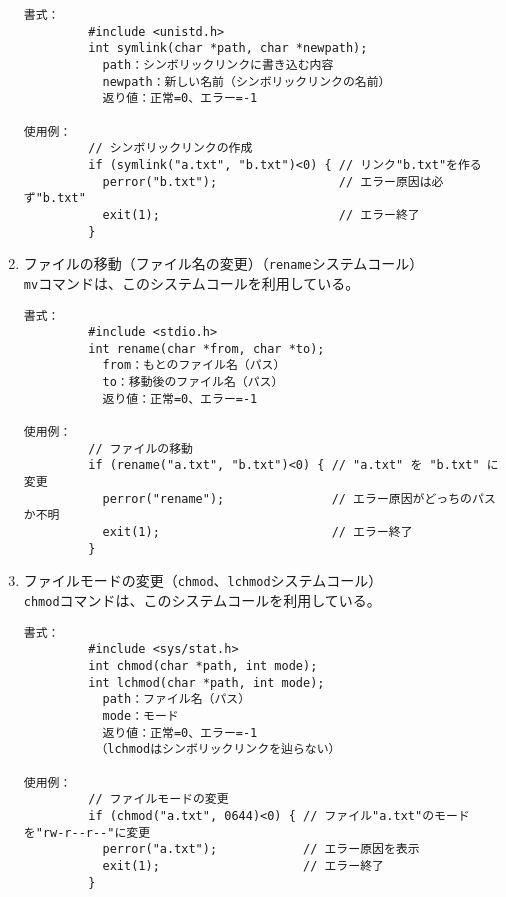 \documentclass[a4j,dvipdfmx]{jarticle}
\begin{document}
\begin{enumerate}
\begin{lstlisting}[numbers=none]
書式：
         #include <unistd.h>
         int symlink(char *path, char *newpath);
           path：シンボリックリンクに書き込む内容
           newpath：新しい名前（シンボリックリンクの名前）
           返り値：正常=0、エラー=-1

使用例：
         // シンボリックリンクの作成
         if (symlink("a.txt", "b.txt")<0) { // リンク"b.txt"を作る
           perror("b.txt");                 // エラー原因は必ず"b.txt"
           exit(1);                         // エラー終了
         }

\end{lstlisting}

\item ファイルの移動（ファイル名の変更）（{\tt rename}システムコール）\\
{\tt mv}コマンドは、このシステムコールを利用している。

\begin{lstlisting}[numbers=none]
書式：
         #include <stdio.h>
         int rename(char *from, char *to);
           from：もとのファイル名（パス）
           to：移動後のファイル名（パス）
           返り値：正常=0、エラー=-1

使用例：
         // ファイルの移動
         if (rename("a.txt", "b.txt")<0) { // "a.txt" を "b.txt" に変更
           perror("rename");               // エラー原因がどっちのパスか不明
           exit(1);                        // エラー終了
         }

\end{lstlisting}

\newpage
\item ファイルモードの変更（{\tt chmod}、{\tt lchmod}システムコール）\\
{\tt chmod}コマンドは、このシステムコールを利用している。

\begin{lstlisting}[numbers=none]
書式：
         #include <sys/stat.h>
         int chmod(char *path, int mode);
         int lchmod(char *path, int mode);
           path：ファイル名（パス）
           mode：モード
           返り値：正常=0、エラー=-1
          （lchmodはシンボリックリンクを辿らない）

使用例：
         // ファイルモードの変更
         if (chmod("a.txt", 0644)<0) { // ファイル"a.txt"のモードを"rw-r--r--"に変更
           perror("a.txt");            // エラー原因を表示
           exit(1);                    // エラー終了
         }


\end{lstlisting}
\end{enumerate}
\end{document}
